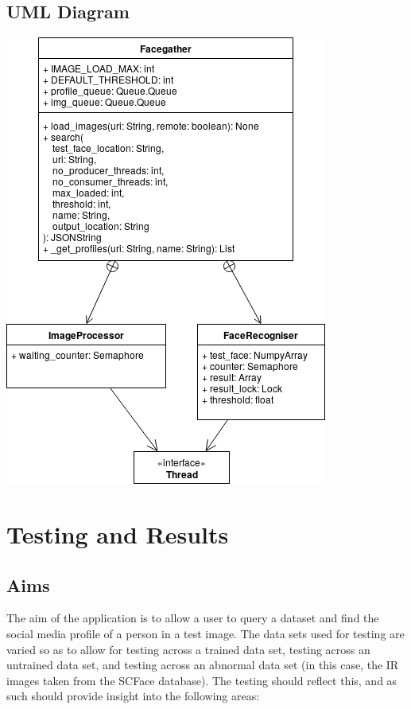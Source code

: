 \documentclass[12pt]{article}
\begin{document}
\subsection{UML Diagram}
\includegraphics[scale=1]{res/facegather_uml.png}

\section{Testing and Results}
\subsection{Aims}
The aim of the application is to allow a user to query a dataset and find the social media profile of a person in a test image. The data sets used for testing are varied so as to allow for testing across a trained data set, testing across an untrained data set, and testing across an abnormal data set (in this case, the IR images taken from the SCFace database). The testing should reflect this, and as such should provide insight into the following areas:
\end{document}
